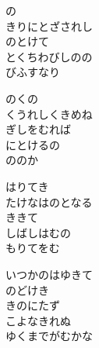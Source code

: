 \documentclass[10pt,b5j]{tarticle} %
\begin{document}
\vspace{1.5em} %
\newcommand{\linespace}{0.5em} %
\newcommand{\blocksize}{0.5\hsize} %
\begin{enumerate} %
    \begin{minipage}[c]{\blocksize}
    
        \vspace{\linespace}
        \item
        の\\
        きりにとざされし\\
        のとけて\\
        とくちわびしのの\\
        びふすなり
        
        \vspace{\linespace}
        \item
        のくの\\
        くうれしくきめね\\
        ぎしをむれば\\
        にとけるの\\
        ののか
        
        \vspace{\linespace}
        \item
        はりてき\\
        たけなはのとなる\\
        ききて\\
        しばしはむの\\
        もりてをむ
        
        \vspace{\linespace}
        \item
        いつかのはゆきて\\
        のどけき\\
        きのにたず\\
        こよなきれぬ\\
        ゆくまでがむかな
        

\end{minipage}
\end{enumerate}
\end{document}
